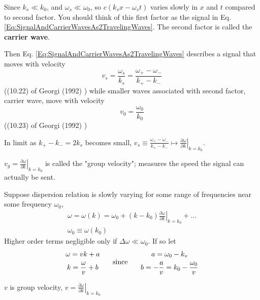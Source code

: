 \documentclass[10pt]{amsart}
\begin{document}
\begin{multicols*}{2}
Since $k_s \ll k_0$, and $\omega_s \ll \omega_0$, so $c(k_s x - \omega_s t)$ varies slowly in $x$ and $t$ compared to second factor. You should think of this first factor as the signal in Eq. \ref{Eq:SignalAndCarrierWavesAs2TravelingWaves}. The second factor is called the \textbf{carrier wave}.

Then Eq. \ref{Eq:SignalAndCarrierWavesAs2TravelingWaves} describes a signal that moves with velocity
\begin{equation}
	v_s = \frac{ \omega_s }{k_s } = \frac{ \omega_+ - \omega_- }{ k_+ - k_- }
\end{equation}
((10.22) of Georgi (1992) \cite{Geor1992}) while smaller waves associated with second factor, carrier wave, move with velocity 
\begin{equation}
	v_0 = \frac{\omega_0}{k_0}
\end{equation}
((10.23) of Georgi (1992) \cite{Geor1992})

In limit as $k_+ - k_- = 2k_s$ becomes small, $v_s \equiv \frac{\omega_+ - \omega_- }{ k_+ - k_-} \mapsto \left. \frac{\partial \omega}{\partial k} \right|_{k=k_0}$.

$v_g = \left. \frac{\partial \omega}{ \partial k} \right|_{k=k_0}$ is called the "group velocity"; measures the speed the signal can actually be sent.

Suppose dispersion relation is slowly varying for some range of frequencies near some frequency $\omega_0$, 
\[
\begin{gathered}
	\omega = \omega(k) = \omega_0 + (k- k_0) \left. \frac{ \partial \omega}{ \partial k } \right|_{k=k_0} + \dots \\
	\omega_0 \equiv \omega(k_0)
\end{gathered}
\]
Higher order terms negligible only if $\Delta \omega \ll \omega_0$. If so let 
\[
\begin{gathered}
	\begin{gathered}
		\omega = vk + a \\
		k = \frac{\omega}{v} + b
	\end{gathered} \text{ \quad \, since \quad \, } \begin{gathered}
	a = \omega_0 - k_v \\
	b = -\frac{a}{v} = k_0 - \frac{ \omega_0}{v}
\end{gathered}
\end{gathered}
\]

$v$ is group velocity, $\left. v = \frac{\partial \omega}{ \partial k} \right|_{k=k_0}$


\end{multicols*}
\end{document}
